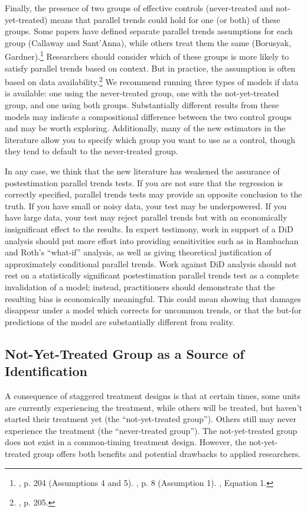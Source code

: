 \documentclass[12pt]{article}
\begin{document}
Finally, the presence of two groups of effective controls (never-treated and not-yet-treated) means that parallel trends could hold for one (or both) of these groups. Some papers have defined separate parallel trends assumptions for each group (Callaway and Sant’Anna), while others treat them the same (Borusyak,  Gardner).\footnote{\citet{CS2021}, p. 204 (Assumptions 4 and 5). \citet{borusyak2024revisiting}, p. 8 (Assumption 1). \citet{gardner2022a}, Equation 1.}  Researchers should consider which of these groups is more likely to satisfy parallel trends based on context. But in practice, the assumption is often based on data availability.\footnote{\citet{CS2021}, p. 205.}  We recommend running three types of models if data is available: one using the never-treated group, one with the not-yet-treated group, and one using both groups. Substantially different results from these models may indicate a compositional difference between the two control groups and may be worth exploring. Additionally, many of the new estimators in the literature allow you to specify which group you want to use as a control, though they tend to default to the never-treated group.

In any case, we think that the new literature has weakened the assurance of postestimation parallel trends tests. If you are not sure that the regression is correctly specified, parallel trends tests may provide an opposite conclusion to the truth. If you have small or noisy data, your test may be underpowered. If you have large data, your test may reject parallel trends but with an economically insignificant effect to the results. In expert testimony, work in support of a DiD analysis should put more effort into providing sensitivities such as in Rambachan and Roth’s “what-if” analysis, as well as giving theoretical justification of approximately conditional parallel trends. Work against DiD analysis should not rest on a statistically significant postestimation parallel trends test as a complete invalidation of a model; instead, practitioners should demonstrate that the resulting bias is economically meaningful. This could mean showing that damages disappear under a model which corrects for uncommon trends, or that the but-for predictions of the model are substantially different from reality.
\subsection{Not-Yet-Treated Group as a Source of Identification}
A consequence of staggered treatment designs is that at certain times, some units are currently experiencing the treatment, while others will be treated, but haven’t started their treatment yet (the “not-yet-treated group”). Others still may never experience the treatment (the “never-treated group”). The not-yet-treated group does not exist in a common-timing treatment design. However, the not-yet-treated group offers both benefits and potential drawbacks to applied researchers.
\end{document}
